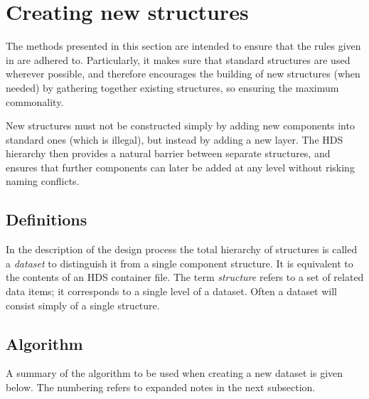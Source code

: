 \documentclass[twoside,11pt,nolof,noabs]{starlink}
\begin{document}
\section{Creating new structures\label{se:newdesign}}

The methods presented in this section are intended to ensure that the rules
given in 
are adhered to. Particularly, it
makes sure that standard structures are used wherever possible, and
therefore encourages the building of new structures (when needed) by
gathering together existing structures, so ensuring the maximum
commonality.

New structures must not be constructed simply by adding new
components into standard ones (which is illegal), but instead by
adding a new layer. The
HDS hierarchy then provides a natural barrier between separate
structures, and ensures that further components can later be added at
any level without risking naming conflicts.

\subsection{Definitions\label{se:newdef}}

In the description
of the design process the total hierarchy of structures is called a
\textit{dataset} to distinguish it from a single component structure.
It is equivalent to the contents of an HDS container file.
The term \textit{structure} refers to a set of related data items; it
corresponds to a single level of a dataset.
Often a dataset will consist simply of a single structure.

\subsection{Algorithm\label{se:newalg}}

A summary of the algorithm to be used when creating a new dataset is
given below.  The  numbering refers to expanded notes
in the next subsection.
\end{document}
